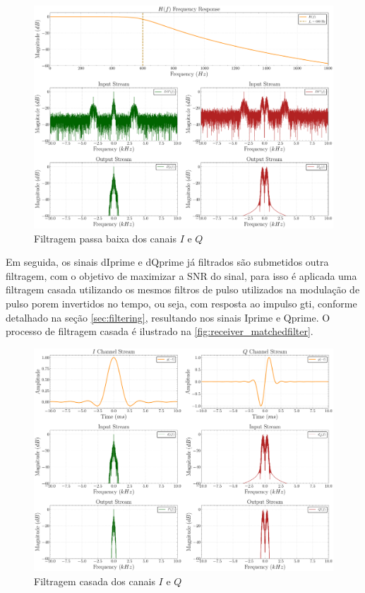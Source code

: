 \begin{figure}[H]
	\centering
	\caption{Filtragem passa baixa dos canais $I$ e $Q$}\label{fig:receiver_lpf}
	\includegraphics[width=\linewidth]{assets/cap3/receiver_lpf_freq.pdf}
\end{figure}

Em seguida, os sinais \gls{dIprime} e \gls{dQprime} já filtrados são submetidos outra filtragem, com o objetivo de maximizar a \gls{SNR} do sinal, para isso é aplicada uma filtragem casada utilizando os mesmos filtros de pulso utilizados na modulação de pulso porem invertidos no tempo, ou seja, com resposta ao impulso \gls{gti}, conforme detalhado na seção \ref{sec:filtering}, resultando nos sinais \gls{Iprime} e \gls{Qprime}. O processo de filtragem casada é ilustrado na \autoref{fig:receiver_matchedfilter}.

\begin{figure}[H]
	\centering
	\caption{Filtragem casada dos canais $I$ e $Q$}\label{fig:receiver_matchedfilter}
	\includegraphics[width=\linewidth]{assets/cap3/receiver_mf_freq.pdf}
\end{figure}

